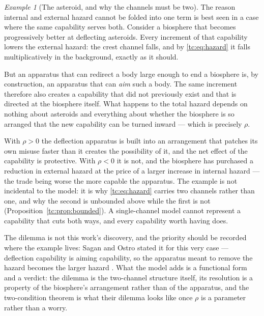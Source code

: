 \documentclass[11pt]{article}
\numberwithin{equation}{section}
\theoremstyle{plain}
\theoremstyle{definition}
\theoremstyle{remark}
\newtheorem{example}[theorem]{Example}
\begin{document}
\begin{example}[The asteroid, and why the channels must be two]
\label{gr1:ex:asteroid}
The reason internal and external hazard cannot be folded into one term
is best seen in a case where the same capability serves both. Consider a
biosphere that becomes progressively better at deflecting asteroids.
Every increment of that capability lowers the external hazard: the
crest channel falls, and by \eqref{tc:eq:hazard} it falls
multiplicatively in the background, exactly as it should.

But an apparatus that can redirect a body large enough to end a
biosphere is, by construction, an apparatus that can \emph{aim} such a
body. The same increment therefore also creates a capability that did
not previously exist and that is directed at the biosphere itself. What
happens to the total hazard depends on nothing about asteroids and
everything about whether the biosphere is so arranged that the new
capability can be turned inward --- which is precisely $\rho$.

With $\rho>0$ the deflection apparatus is built into an arrangement that
patches its own misuse faster than it creates the possibility of it, and
the net effect of the capability is protective. With $\rho<0$ it is not,
and the biosphere has purchased a reduction in external hazard at the
price of a larger increase in internal hazard --- the trade being worse
the more capable the apparatus. The example is not incidental to the
model: it is why \eqref{tc:eq:hazard} carries two channels rather than
one, and why the second is unbounded above while the first is not
(Proposition~\ref{tc:prop:bounded}). A single-channel model cannot
represent a capability that cuts both ways, and every capability worth
having does.

The dilemma is not this work's discovery, and the priority should be
recorded where the example lives: Sagan and Ostro stated it for this
very case --- deflection capability is aiming capability, so the
apparatus meant to remove the hazard becomes the larger hazard
\cite{SO94}. What the model adds is a functional form and a verdict:
the dilemma is the two-channel structure itself, its resolution is a
property of the biosphere's arrangement rather than of the apparatus,
and the two-condition theorem is what their dilemma looks like once
$\rho$ is a parameter rather than a worry.
\end{example}
\end{document}
